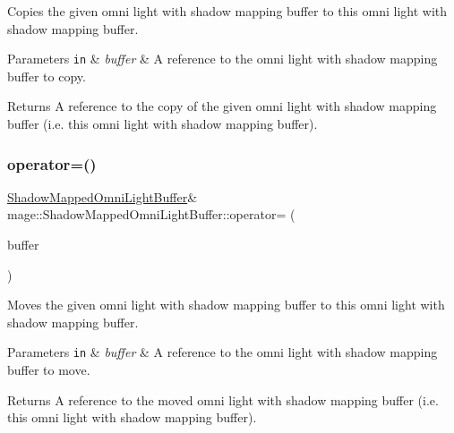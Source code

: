 Copies the given omni light with shadow mapping buffer to this omni light with shadow mapping buffer.


\begin{DoxyParams}[1]{Parameters}
\mbox{\tt in}  & {\em buffer} & A reference to the omni light with shadow mapping buffer to copy. \\
\hline
\end{DoxyParams}
\begin{DoxyReturn}{Returns}
A reference to the copy of the given omni light with shadow mapping buffer (i.\+e. this omni light with shadow mapping buffer). 
\end{DoxyReturn}
\hypertarget{structmage_1_1_shadow_mapped_omni_light_buffer_a35a4b85d3f556437a10d330ef32abc0d}{}\label{structmage_1_1_shadow_mapped_omni_light_buffer_a35a4b85d3f556437a10d330ef32abc0d} 
\subsubsection{\texorpdfstring{operator=()}{operator=()}\hspace{0.1cm}{\footnotesize\ttfamily [2/2]}}
{\footnotesize\ttfamily \hyperlink{structmage_1_1_shadow_mapped_omni_light_buffer}{Shadow\+Mapped\+Omni\+Light\+Buffer}\& mage\+::\+Shadow\+Mapped\+Omni\+Light\+Buffer\+::operator= (\begin{DoxyParamCaption}\item[{\hyperlink{structmage_1_1_shadow_mapped_omni_light_buffer}{Shadow\+Mapped\+Omni\+Light\+Buffer} \&\&}]{buffer }\end{DoxyParamCaption})\hspace{0.3cm}{\ttfamily [default]}}

Moves the given omni light with shadow mapping buffer to this omni light with shadow mapping buffer.


\begin{DoxyParams}[1]{Parameters}
\mbox{\tt in}  & {\em buffer} & A reference to the omni light with shadow mapping buffer to move. \\
\hline
\end{DoxyParams}
\begin{DoxyReturn}{Returns}
A reference to the moved omni light with shadow mapping buffer (i.\+e. this omni light with shadow mapping buffer). 
\end{DoxyReturn}


